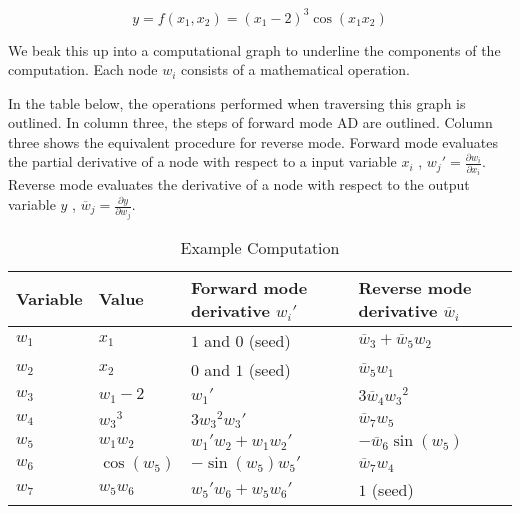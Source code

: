\documentclass[11pt]{article}
\begin{document}
\[ y = f(x_1, x_2)=(x_1-2)^3\cos(x_1x_2) \]

We beak this up into a computational graph to underline the components of the computation. Each node $ w_i $ consists of a mathematical operation.


In the table below, the operations performed when traversing this graph is outlined. In column three, the steps of forward mode AD are outlined. Column three shows the equivalent procedure for reverse mode. 
Forward mode evaluates the partial derivative of a node with respect to a input variable $ x_i $ , ${w_j}' = \frac{\partial w_i}{\partial x_i} $. Reverse mode evaluates the derivative of a node with respect to the output variable $ y $ , $ \overline w_j = \frac{\partial y}{\partial w_j} $.

\begin{table}[]
\centering
\caption{Example Computation}
\label{my-label}
\begin{tabular}{|l|l|l|l|}
\hline
Variable  & Value & Forward mode derivative ${w_i}'$ & Reverse mode derivative $ \overline w_i $                      \\ \hline
$ w_1 $ & $ x_1 $                   & $ 1 $ and $ 0 $ (seed)                                 & $ \overline{w}_3 +  \overline{w}_5 w_2 $ \\ \hline
$ w_2 $ & $ x_2 $                   & $ 0 $ and $ 1 $ (seed)                                 & $ \overline{w}_5 w_1 $                   \\ \hline
$ w_3 $ & $ w_1-2 $                 & $ {w_1}' $                                                 & $ 3\overline{w}_4 {w_3}^2 $              \\ \hline
$ w_4 $ & $ {w_3}^3 $               & $ 3{w_3}^2{w_3}' $                                         & $ \overline{w}_7 w_5 $                   \\ \hline
$ w_5 $ & $ w_1w_2 $                & $ {w_1}' w_2+w_1 {w_2}' $                                  & $ - \overline{w}_6 \sin(w_5) $          \\ \hline
$ w_6 $ & $ \cos(w_5) $             & $ -\sin(w_5){w_5}' $                                       & $ \overline{w}_7 {w_4} $                 \\ \hline
$ w_7 $ & $ w_5w_6 $                & $ {w_5}'w_6+w_5{w_6}' $                                    & $ 1 $ (seed)                            \\ \hline
\end{tabular}
\end{table}
\end{document}
